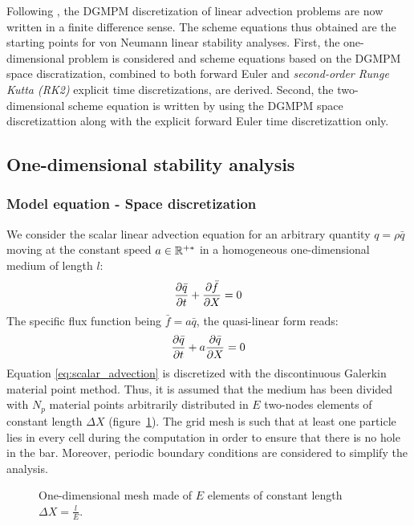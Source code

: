 Following \cite{Hirsch}, the DGMPM discretization of linear advection problems are now written in a finite difference sense. The scheme equations thus obtained are the starting points for von Neumann linear stability analyses. First, the one-dimensional problem is considered and scheme equations based on the DGMPM space discratization, combined to both forward Euler and \textit{second-order Runge Kutta (RK2)} explicit time discretizations, are derived. Second, the two-dimensional scheme equation is written by using the DGMPM space discretizattion along with the explicit forward Euler time discretizattion only.

\subsection{One-dimensional stability analysis}
\label{subsec:scheme_equations}
\subsubsection*{Model equation - Space discretization}
We consider the scalar linear advection equation for an arbitrary quantity $q=\rho \bar{q}$ moving at the constant speed $a \in \mathbb{R}^{+*}$ in a homogeneous one-dimensional medium of length $l$:
\begin{equation}
\frac{\partial \bar{q}}{\partial t} + \frac{\partial \bar{f}}{\partial X} = 0 
\end{equation}
The specific flux function being $\bar{f} = a\bar{q}$, the quasi-linear form reads:
\begin{equation}
\frac{\partial \bar{q}}{\partial t} + a\frac{\partial \bar{q}}{\partial X} = 0 \label{eq:scalar_advection}
\end{equation}
Equation \eqref{eq:scalar_advection} is discretized with the discontinuous Galerkin material point method. Thus, it is assumed that the medium has been divided with $N_p$ material points arbitrarily distributed in $E$ two-nodes elements of constant length $\Delta X$ (figure~\ref{fig:1Dmesh}). The grid mesh is such that at least one particle lies in every cell during the computation in order to ensure that there is no hole in the bar. Moreover, periodic boundary conditions are considered to simplify the analysis.
\begin{figure}[h!]
  \centering
  
  \caption{One-dimensional mesh made of $E$ elements of constant length $\Delta X = \frac{l}{E}$.}\label{fig:1Dmesh}
\end{figure}

